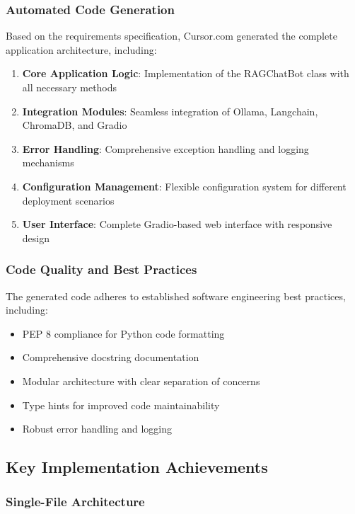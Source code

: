 \subsubsection{Automated Code Generation}

Based on the requirements specification, Cursor.com generated the complete application architecture, including:

\begin{enumerate}
    \item \textbf{Core Application Logic}: Implementation of the RAGChatBot class with all necessary methods
    \item \textbf{Integration Modules}: Seamless integration of Ollama, Langchain, ChromaDB, and Gradio
    \item \textbf{Error Handling}: Comprehensive exception handling and logging mechanisms
    \item \textbf{Configuration Management}: Flexible configuration system for different deployment scenarios
    \item \textbf{User Interface}: Complete Gradio-based web interface with responsive design
\end{enumerate}

\subsubsection{Code Quality and Best Practices}

The generated code adheres to established software engineering best practices, including:

\begin{itemize}
    \item PEP 8 compliance for Python code formatting
    \item Comprehensive docstring documentation
    \item Modular architecture with clear separation of concerns
    \item Type hints for improved code maintainability
    \item Robust error handling and logging
\end{itemize}

\subsection{Key Implementation Achievements}

\subsubsection{Single-File Architecture}

